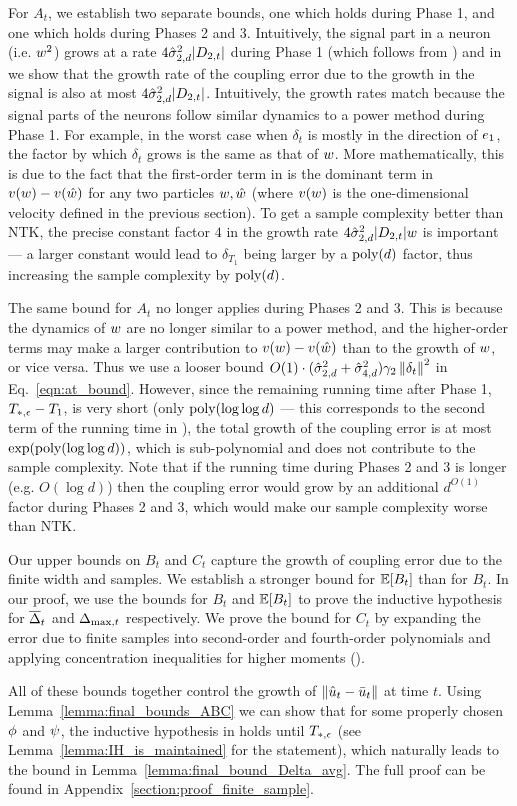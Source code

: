 For $A_t$, we establish two separate bounds, one which holds during Phase 1, and one which holds during Phases 2 and 3. Intuitively, the signal part in a neuron (i.e. $w^2$) grows at a rate $4 \hat{\sigma}_{2, d}^2 |D_{2, t}|$ during Phase 1 (which follows from ) and in  we show that the growth rate of the coupling error due to the growth in the signal is also at most $4 \hat{\sigma}_{2, d}^2 |D_{2, t}|$. Intuitively, the growth rates match because the signal parts of the neurons follow similar dynamics to a power method during Phase 1. For example, in the worst case when $\delta_t$ is mostly in the direction of $e_1$, the factor by which $\delta_t$ grows is the same as that of $w$. More mathematically, this is due to the fact that the first-order term in  is the dominant term in $v(w) - v(\hat{w})$ for any two particles $w, \hat{w}$ (where $v(w)$ is the one-dimensional velocity defined in the previous section). To get a sample complexity better than NTK, the precise constant factor $4$ in the growth rate $4 \hat{\sigma}_{2, d}^2 |D_{2, t}| w$ is important --- a larger constant would lead to $\delta_{T_1}$ being larger by a $\textup{poly}(d)$ factor, thus increasing the sample complexity by $\textup{poly}(d)$.

The same bound for $A_t$ no longer applies during Phases 2 and 3. This is because the dynamics of $w$ are no longer similar to a power method, and the higher-order terms may make a larger contribution to $v(w) - v(\hat{w})$ than to the growth of $w$, or vice versa. Thus we use a looser bound $O(1)\cdot (\hat{\sigma}_{2, d}^2 + \hat{\sigma}_{4, d}^2)\gamma_2 \left\lVert\delta_t\right\rVert^2$ in Eq.~\eqref{eqn:at_bound}. However, since the remaining running time after Phase 1, $T_{*, \epsilon}-T_1$, is very short (only $\textup{poly}(\log\log d)$ --- this corresponds to the second term of the running time in ), the total growth of the coupling error is at most $\exp(\textup{poly}(\log\log d))$, which is sub-polynomial and does not contribute to the sample complexity. Note that if the running time during Phases 2 and 3 is longer (e.g. $O(\log d)$) then the coupling error would grow by an additional $d^{O(1)}$ factor during Phases 2 and 3, which would make our sample complexity worse than NTK.

Our upper bounds on $B_t$ and $C_t$ capture the growth of coupling error due to the finite width and samples. We establish a stronger bound for $\operatorname*{\mathbb{E}}[B_t]$ than for $B_t$. In our proof, we use the bounds for $B_t$ and $\operatorname*{\mathbb{E}}[B_t]$ to prove the inductive hypothesis for $\overline{\Delta}_t$ and $\Delta_{\textup{max}, t}$ respectively. We prove the bound for $C_t$ by expanding the error due to finite samples into second-order and fourth-order polynomials and applying concentration inequalities for higher moments ().

All of these bounds together control the growth of $\left\lVert\hat{u}_t - \bar{u}_t\right\rVert$ at time $t$. Using Lemma~\ref{lemma:final_bounds_ABC} we can show that for some properly chosen $\phi$ and $\psi$, the inductive hypothesis in  holds until $T_{*, \epsilon}$ (see Lemma~\ref{lemma:IH_is_maintained} for the statement), which naturally leads to the bound in Lemma~\ref{lemma:final_bound_Delta_avg}. The full proof can be found in Appendix~\ref{section:proof_finite_sample}. 